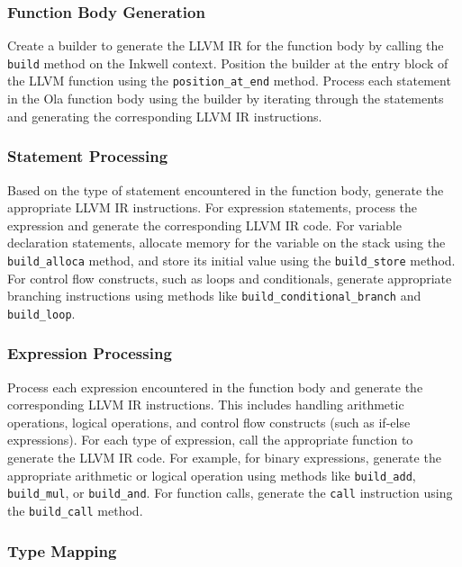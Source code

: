 \subsubsection*{Function Body Generation}

Create a builder to generate the LLVM IR for the function body by calling the \texttt{build} method on the Inkwell context. Position the builder at the entry block of the LLVM function using the \texttt{position\_at\_end} method. Process each statement in the Ola function body using the builder by iterating through the statements and generating the corresponding LLVM IR instructions.

\subsubsection*{Statement Processing}

Based on the type of statement encountered in the function body, generate the appropriate LLVM IR instructions. For expression statements, process the expression and generate the corresponding LLVM IR code. For variable declaration statements, allocate memory for the variable on the stack using the \texttt{build\_alloca} method, and store its initial value using the \texttt{build\_store} method. For control flow constructs, such as loops and conditionals, generate appropriate branching instructions using methods like \texttt{build\_conditional\_branch} and \texttt{build\_loop}.

\subsubsection*{Expression Processing}

Process each expression encountered in the function body and generate the corresponding LLVM IR instructions. This includes handling arithmetic operations, logical operations, and control flow constructs (such as if-else expressions). For each type of expression, call the appropriate function to generate the LLVM IR code. For example, for binary expressions, generate the appropriate arithmetic or logical operation using methods like \texttt{build\_add}, \texttt{build\_mul}, or \texttt{build\_and}. For function calls, generate the \texttt{call} instruction using the \texttt{build\_call} method.

\subsubsection*{Type Mapping}

